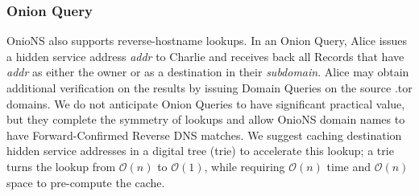 \documentclass[USenglish,oneside,twocolumn]{article}
\begin{document}
\subsubsection{Onion Query}

OnioNS also supports reverse-hostname lookups. In an Onion Query, Alice issues a hidden service address \emph{addr} to Charlie and receives back all Records that have \emph{addr} as either the owner or as a destination in their \emph{subdomain}. Alice may obtain additional verification on the results by issuing Domain Queries on the source .tor domains. We do not anticipate Onion Queries to have significant practical value, but they complete the symmetry of lookups and allow OnioNS domain names to have Forward-Confirmed Reverse DNS matches. We suggest caching destination hidden service addresses in a digital tree (trie) to accelerate this lookup; a trie turns the lookup from $ \mathcal{O}(n) $ to $ \mathcal{O}(1) $, while requiring $ \mathcal{O}(n) $ time and $ \mathcal{O}(n) $ space to pre-compute the cache.



\end{document}
